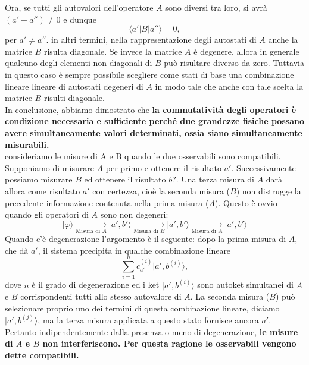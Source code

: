 \documentclass[a4paper,12pt,oneside]{book}
\begin{document}
Ora, se tutti gli autovalori dell'operatore $A$ sono diversi tra loro, si avrà $(a'-a'') \neq 0$ e dunque
\begin{equation}
\langle a' \vert B \vert a'' \rangle =0,
\end{equation}
per $a' \neq a''$.
in altri termini, nella rappresentazione degli autostati di $A$ anche la matrice $B$ risulta diagonale. Se invece la matrice $A$ è degenere, allora in generale qualcuno degli elementi non diagonali di $B$ può risultare diverso da zero. Tuttavia in questo caso è sempre possibile scegliere come stati di base una combinazione lineare lineare di autostati degeneri di $A$ in modo tale che anche con tale scelta la matrice $B$ risulti diagonale.\\
In conclusione, abbiamo dimostrato che \textbf{la commutatività degli operatori è condizione necessaria e sufficiente perché due grandezze fisiche possano avere simultaneamente valori determinati, ossia siano simultaneamente misurabili.}\\
consideriamo le misure di A e B quando le due osservabili sono compatibili. Supponiamo di misurare $A$ per primo e ottenere il risultato $a'$. Successivamente possiamo misurare $B$ ed ottenere il risultato $b?$. Una terza misura di $A$ darà allora come risultato $a'$ con certezza, cioè la seconda misura ($B$) non distrugge la precedente informazione contenuta nella prima misura ($A$). Questo è ovvio quando gli operatori di $A$ sono non degeneri:
\begin{equation}
\vert \varphi \rangle \xrightarrow[\textrm{Misura di }A]{ } \vert a',b' \rangle \xrightarrow[\textrm{Misura di }B]{ } \vert a',b' \rangle \xrightarrow[\textrm{Misura di }A]{ } \vert a',b' \rangle  
\end{equation}
Quando c'è degenerazione l'argomento  è il seguente: dopo la prima misura di $A$, che dà $a'$, il sistema precipita in qualche combinazione lineare
\begin{equation}
\sum _{i=1} ^n c_{a'} ^{(i)} \vert a', b^{(i)} \rangle ,
\end{equation}
dove $n$ è il grado di degenerazione ed i ket $\vert a', b^{(i)} \rangle $ sono autoket simultanei di $A$ e $B$ corrispondenti tutti allo stesso autovalore di $A$. La seconda misura ($B$) può selezionare proprio uno dei termini di questa combinazione lineare, diciamo $\vert a', b^{(j)} \rangle $, ma la terza misura applicata a questo stato fornisce ancora $a'$. Pertanto indipendentemente dalla presenza o meno di degenerazione, \textbf{le misure di $A$ e $B$ non interferiscono. Per questa ragione le osservabili vengono dette compatibili.}\\
\end{document}
